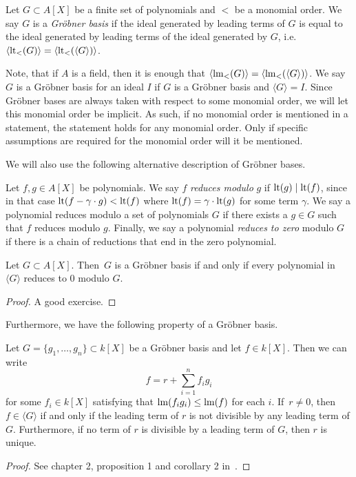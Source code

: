 \begin{definition}
  Let $G \subset A[X]$ be a finite set of polynomials and $<$ be a monomial order. We say $G$ is a \textit{Gröbner basis} if the ideal generated by leading terms of $G$ is equal to the ideal generated by leading terms of the ideal generated by $G$, i.e.
  $\langle \operatorname{lt}_{<}(G) \rangle = \langle \operatorname{lt}_{<}(\langle G \rangle) \rangle$.
\end{definition}

Note, that if $A$ is a field, then it is enough that $\langle \operatorname{lm}_{<}(G) \rangle = \langle \operatorname{lm}_{<}(\langle G \rangle) \rangle$. We say $G$ is a Gröbner basis for an ideal $I$ if $G$ is a Gröbner basis and $\langle G \rangle = I$. Since Gröbner bases are always taken with respect to some monomial order, we will let this monomial order be implicit. As such, if no monomial order is mentioned in a statement, the statement holds for any monomial order. Only if specific assumptions are required for the monomial order will it be mentioned.

We will also use the following alternative description of Gröbner bases.

\begin{definition}
  Let $f, g \in A[X]$ be polynomials. We say $f$ \textit{reduces modulo} $g$ if $\operatorname{lt}(g) \mid \operatorname{lt}(f)$, since in that case $\operatorname{lt}(f - \gamma\cdot g) < \operatorname{lt}(f)$ where $\operatorname{lt}(f) = \gamma \cdot \operatorname{lt}(g)$ for some term $\gamma$. We say a polynomial reduces modulo a set of polynomials $G$ if there exists a $g \in G$ such that $f$ reduces modulo $g$. Finally, we say a polynomial \textit{reduces to zero} modulo $G$ if there is a chain of reductions that end in the zero polynomial.
\end{definition}

\begin{theorem}\label{thm:grb}
  Let $G \subset A[X]$. Then $\,G$ is a Gröbner basis if and only if every polynomial in $\langle G \rangle$ reduces to 0 modulo $G$.
\end{theorem}
\begin{proof}
  A good exercise.
\end{proof}

Furthermore, we have the following property of a Gröbner basis.

\begin{theorem}
  Let $G = \{g_{1}, \dots, g_{n}\} \subset k[X]$ be a Gröbner basis and let $f \in k[X]$. Then we can write
  \[f = r + \sum_{i=1}^{n} f_{i}g_{i}\]
  for some $f_{i} \in k[X]$ satisfying that $\operatorname{lm}(f_{i} g_{i}) \leq \operatorname{lm}(f)$ for each $i$. If $\,r \neq 0$, then $f \in \langle G \rangle$ if and only if the leading term of $r$ is not divisible by any leading term of $G$. Furthermore, if no term of $r$ is divisible by a leading term of $G$, then $r$ is unique.
\end{theorem}
\begin{proof}
  See chapter 2, proposition 1 and corollary 2 in~\cite{IVA}.
\end{proof}



